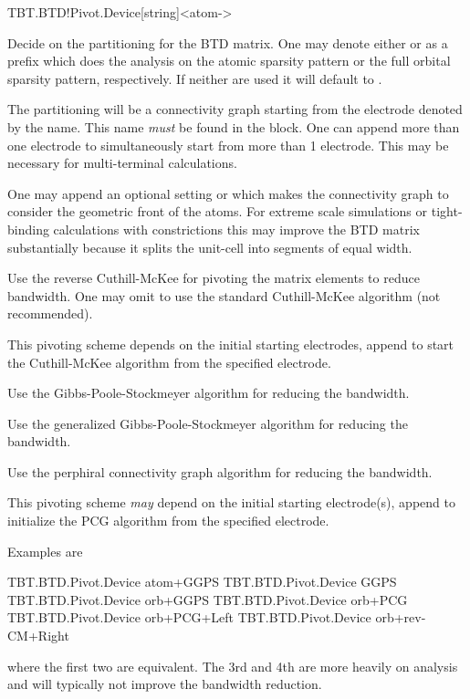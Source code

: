 \begin{fdfentry}{TBT.BTD!Pivot.Device}[string]<atom->

  Decide on the partitioning for the BTD matrix. One may denote either
   or  as a prefix which does the analysis on
  the atomic sparsity pattern or the full orbital sparsity pattern,
  respectively. If neither are used it will default to .

  \begin{fdfoptions}

    The partitioning will be a connectivity graph starting from the
    electrode denoted by the name. This name \emph{must} be found in
    the  block. One can append more than one electrode
    to simultaneously start from more than 1 electrode. This may be
    necessary for multi-terminal calculations.

    \note One may append an optional setting  or
     which makes the connectivity graph to consider the
    geometric front of the atoms. For extreme scale simulations or
    tight-binding calculations with constrictions this may improve the
    BTD matrix substantially because it splits the unit-cell into
    segments of equal width.

    \option[rev-CM] %
    Use the reverse Cuthill-McKee for pivoting the matrix elements to
    reduce bandwidth. One may omit  to use the standard
    Cuthill-McKee algorithm (not recommended).

    This pivoting scheme depends on the initial starting
    electrodes, append  to start the Cuthill-McKee
    algorithm from the specified electrode.

    \option[GPS] %
    Use the Gibbs-Poole-Stockmeyer algorithm for reducing the
    bandwidth.

    \option[GGPS] %
    Use the generalized Gibbs-Poole-Stockmeyer algorithm for reducing
    the bandwidth.

    \option[PCG] %
    Use the perphiral connectivity graph algorithm for reducing the
    bandwidth.

    This pivoting scheme \emph{may} depend on the initial starting
    electrode(s), append  to initialize the PCG
    algorithm from the specified electrode.

  \end{fdfoptions}

  Examples are
  \begin{fdfexample}
    TBT.BTD.Pivot.Device atom+GGPS
    TBT.BTD.Pivot.Device GGPS
    TBT.BTD.Pivot.Device orb+GGPS
    TBT.BTD.Pivot.Device orb+PCG
    TBT.BTD.Pivot.Device orb+PCG+Left
    TBT.BTD.Pivot.Device orb+rev-CM+Right
  \end{fdfexample}
  where the first two are equivalent. The 3rd and 4th are more heavily
  on analysis and will typically not improve the bandwidth reduction.

\end{fdfentry}


